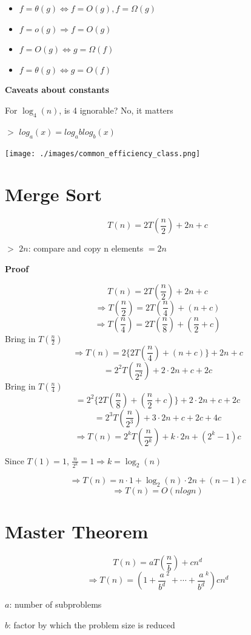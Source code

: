 \documentclass[12pt,a4paper]{article}
\newcommand{\remark}[1]{
    {\small $>$ {\color{blue} #1}}
}
\begin{document}
\begin{itemize}
    \item $f = \theta(g) \iff f = O(g),f = \Omega(g)$
    \item $f = o(g) \Rightarrow f = O(g)$
    \item $f = O(g) \iff g = \Omega(f)$
    \item $f = \theta(g) \iff g = O(f)$
\end{itemize}

\textbf{Caveats about constants}

For $\log_4(n)$, is 4 ignorable? No, it matters

\remark{$log_a(x) = log_a blog_b(x)$}

\texttt{[image: ./images/common\_efficiency\_class.png]}

\section*{Merge Sort}

\[T(n) = 2T(\frac{n}{2}) + 2n + c\]

\remark{$2n$: compare and copy n elements $= 2n$}

\textbf{Proof}

\[T(n) = 2T(\frac{n}{2}) + 2n + c\]
\[\Rightarrow T(\frac{n}{2}) = 2T(\frac{n}{4}) + (n + c)\]
\[\Rightarrow T(\frac{n}{4}) = 2T(\frac{n}{8}) + (\frac{n}{2} + c)\] Bring in $T(\frac{n}{2})$
\[\Rightarrow T(n) = 2\{2T(\frac{n}{4}) + (n + c)\} + 2n + c\]
\[= 2^2T(\frac{n}{2^2}) + 2 \cdot 2n + c + 2c\] Bring in $T(\frac{n}{4})$
\[= 2^2\{2T(\frac{n}{8}) + (\frac{n}{2} + c)\} + 2 \cdot 2n + c + 2c\]
\[= 2^3T(\frac{n}{2^3}) + 3 \cdot 2n + c + 2c + 4c\]
\[\Rightarrow T(n)= 2^kT(\frac{n}{2^k}) + k \cdot 2n + (2^k-1)c\]

Since $T(1) = 1$, $\frac{n}{2^k} = 1 \Rightarrow k = \log_2(n)$

\[\Rightarrow T(n) = n \cdot 1 + \log_2(n) \cdot 2n + (n-1)c\]
\[\Rightarrow T(n) = O(nlogn) \]

\section*{Master Theorem}

\[T(n) = aT(\frac{n}{b}) + cn^d\]
\[\Rightarrow T(n) = (1 + \frac{a}{b^d}^2 + \cdots + \frac{a}{b^d}^k)cn^d\]

$a$: number of subproblems

$b$: factor by which the problem size is reduced
\end{document}
